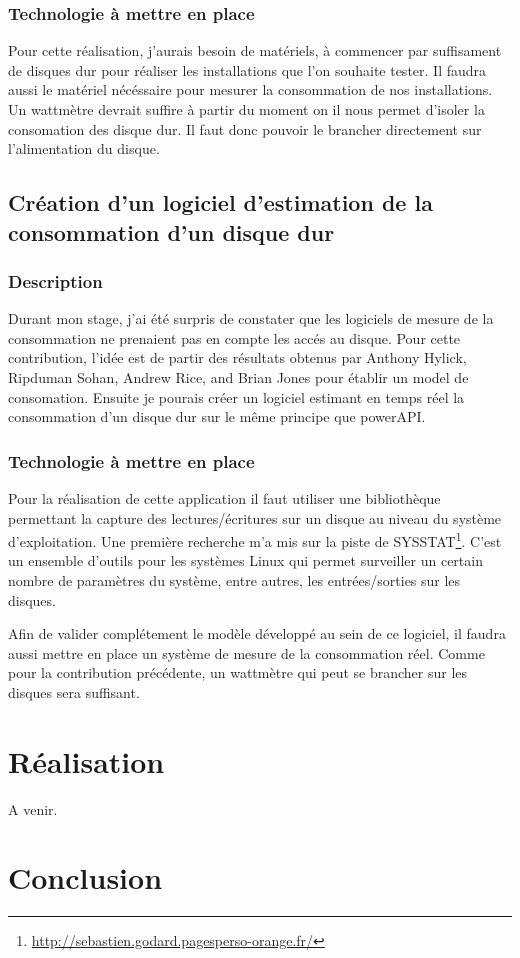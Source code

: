 \documentclass[a4paper, 11pt]{report}
\begin{document}
		\subsection{Technologie à mettre en place}
Pour cette réalisation, j'aurais besoin de matériels, à commencer par suffisament de disques dur pour réaliser les installations que l'on souhaite tester. Il faudra aussi le matériel nécéssaire pour mesurer la consommation de nos installations. Un wattmètre devrait suffire à partir du moment on il nous permet d'isoler la consomation des disque dur. Il faut donc pouvoir le brancher directement sur l'alimentation du disque.  

	\section{Création d'un logiciel d'estimation de la consommation d'un disque dur}
		\subsection{Description}
Durant mon stage, j'ai été surpris de constater que les logiciels de mesure de la consommation ne prenaient pas en compte les accés au disque. Pour cette contribution, l'idée est de partir des résultats obtenus par Anthony Hylick, Ripduman Sohan, Andrew Rice, and Brian Jones\cite{hylick2008analysis} pour établir un model de consomation. Ensuite je pourais créer un logiciel estimant en temps réel la consommation d'un disque dur sur le même principe que powerAPI\cite{noureddine:hal-00681560}.

		\subsection{Technologie à mettre en place}
Pour la réalisation de cette application il faut utiliser une bibliothèque permettant la capture des lectures/écritures sur un disque au niveau du système d'exploitation. Une première recherche m'a mis sur la piste de SYSSTAT\footnote{\href{http://sebastien.godard.pagesperso-orange.fr/}{http://sebastien.godard.pagesperso-orange.fr/}}. C'est un ensemble d'outils pour les systèmes Linux qui permet surveiller un certain nombre de paramètres du système, entre autres, les entrées/sorties sur les disques.

Afin de valider complétement le modèle développé au sein de ce logiciel, il faudra aussi mettre en place un système de mesure de la consommation réel. Comme pour la contribution précédente, un wattmètre qui peut se brancher sur les disques sera suffisant.

\chapter{Réalisation}
A venir.

\chapter{Conclusion}



\listoffigures{}
\listoftables{}

\appendix
\end{document}
